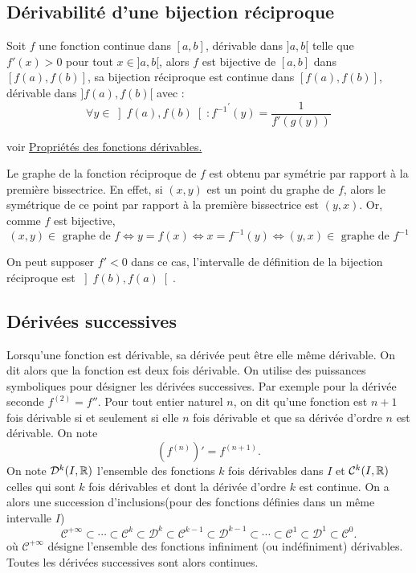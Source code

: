 \subsection{Dérivabilité d'une bijection réciproque}
\begin{thm}
 Soit $f$ une fonction continue dans $[a,b]$, dérivable dans $]a,b[$ telle que $f'(x)>0$ pour tout $x\in]a,b[$, alors $f$ est bijective de $[a,b]$ dans $[f(a),f(b)]$, sa bijection réciproque est continue dans $[f(a),f(b)]$, dérivable dans $]f(a),f(b)[$ avec :
\begin{displaymath}
 \forall y \in \left]f(a),f(b)\right[ : {f^{-1}}^\prime(y) = \dfrac{1}{f'(g(y))}
\end{displaymath}
\end{thm}
voir \href{\baseurl C2070.pdf}{Propriétés des fonctions dérivables.}
\begin{rem}
 Le graphe de la fonction réciproque de $f$ est obtenu par symétrie par rapport à la première bissectrice. En effet, si $(x,y)$ est un point du graphe de $f$, alors le symétrique de ce point par rapport à la première bissectrice est $(y,x)$. Or, comme $f$ est bijective,
 \begin{displaymath}
  (x,y)\in\text{ graphe de $f$} \Leftrightarrow y = f(x)
  \Leftrightarrow x = f^{-1}(y) \Leftrightarrow (y,x) \in \text{ graphe de $f^{-1}$}
 \end{displaymath}
\end{rem}
On peut supposer $f'<0$ dans ce cas, l'intervalle de définition de la bijection réciproque est $\left]f(b),f(a)\right[$.

\subsection{Dérivées successives}
Lorsqu'une fonction est dérivable, sa dérivée peut être elle même dérivable. On dit alors que la fonction est deux fois dérivable.\newline
On utilise des puissances symboliques pour désigner les dérivées successives. Par exemple pour la dérivée seconde $f^{(2)} = f''$.\newline
Pour tout entier naturel $n$, on dit qu'une fonction est $n+1$ fois dérivable si et seulement si elle $n$ fois dérivable et que sa dérivée d'ordre $n$ est dérivable. On note
\[
 \left( f^{(n)}\right)' = f^{(n+1)}. 
\]
On note $\mathcal{D}^{k}(I,\mathbb{R})$ l'ensemble des fonctions $k$ fois dérivables dans $I$ et $\mathcal{C}^{k}(I,\mathbb{R})$ celles qui sont $k$ fois dérivables et dont la dérivée d'ordre $k$ est continue. On a alors une succession d'inclusions(pour des fonctions définies dans un même intervalle $I$)
\[
\mathcal{C}^{+\infty} \subset \cdots \subset \mathcal{C}^{k} \subset \mathcal{D}^{k} \subset \mathcal{C}^{k-1} \subset \mathcal{D}^{k-1} \subset \cdots \subset \mathcal{C}^{1} \subset \mathcal{D}^{1}\subset \mathcal{C}^{0}.
\]
où $\mathcal{C}^{+\infty}$ désigne l'ensemble des fonctions infiniment (ou indéfiniment) dérivables. Toutes les dérivées successives sont alors continues.

